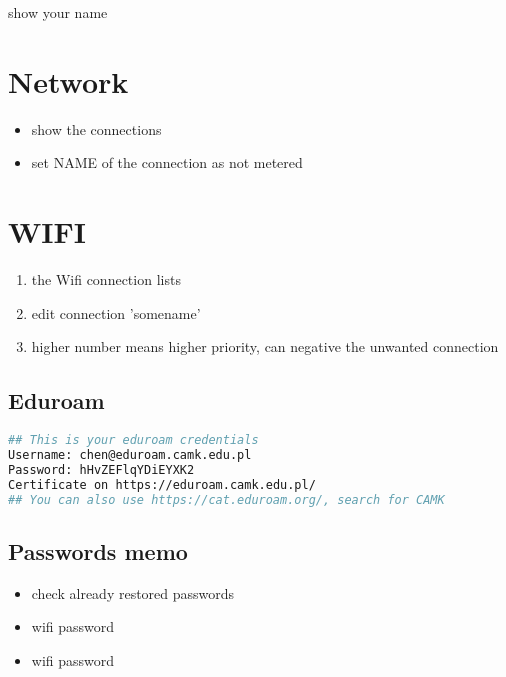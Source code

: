 
 show your name


\section{Network}

\begin{itemize}
\item{} show the connections
\item{} set NAME of the connection as not metered
\end{itemize}

\section{WIFI}
\begin{enumerate}
\item{} the Wifi connection lists
\item{} edit connection 'somename'
\item{} higher number means higher priority, can negative the unwanted connection
\end{enumerate}

\subsection{Eduroam}
\begin{lstlisting}[language=bash, caption={/home/chen/.ssh/eduroam.txt}]
## This is your eduroam credentials
Username: chen@eduroam.camk.edu.pl
Password: hHvZEFlqYDiEYXK2
Certificate on https://eduroam.camk.edu.pl/
## You can also use https://cat.eduroam.org/, search for CAMK
\end{lstlisting}

\subsection{Passwords memo}
\begin{itemize}
\item{} check already restored passwords
\item {} wifi password 
\item {} wifi password 
\end{itemize}

